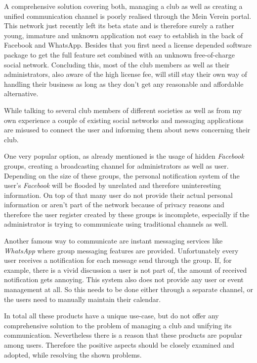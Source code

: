 A comprehensive solution covering both, managing a club as well as creating a unified communication channel is poorly realised through the Mein Verein portal. This network just recently left its beta state and is therefore surely a rather young, immature and unknown application not easy to establish in the back of Facebook and WhatsApp. Besides that you first need a license depended software package to get the full feature set combined with an unknown free-of-charge social network. Concluding this, most of the club members as well as their administrators, also aware of the high license fee, will still stay their own way of handling their business as long as they don't get any reasonable and affordable alternative. 

While talking to several club members of different societies as well as from my own experience a couple of existing social networks and messaging applications are misused to connect the user and informing them about news concerning their club. 

One very popular option, as already mentioned is the usage of hidden \emph{Facebook} groups, creating a broadcasting channel for administrators as well as user. Depending on the size of these groups, the personal notification system of the user's \emph{Facebook} will be flooded by unrelated and therefore uninteresting information. On top of that many user do not provide their actual personal information or aren't part of the network because of privacy reasons and therefore the user register created by these groups is incomplete, especially if the administrator is trying to communicate using traditional channels as well. 

Another famous way to communicate are instant messaging services like \emph{WhatsApp} where group messaging features are provided. Unfortunately every user receives a notification for each message send through the group. If, for example, there is a vivid discussion a user is not part of, the amount of received notification gets annoying. This system also does not provide any user or event management at all. So this needs to be done either through a separate channel, or the users need to manually maintain their calendar.

In total all these products have a unique use-case, but do not offer any comprehensive solution to the problem of managing a club and unifying its communication. Nevertheless there is a reason that these products are popular among users. Therefore the positive aspects should be closely examined and adopted, while resolving the shown problems.


